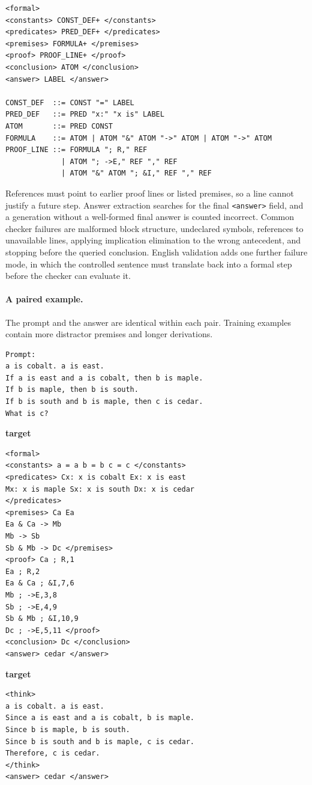 \begin{verbatim}
<formal>
<constants> CONST_DEF+ </constants>
<predicates> PRED_DEF+ </predicates>
<premises> FORMULA+ </premises>
<proof> PROOF_LINE+ </proof>
<conclusion> ATOM </conclusion>
<answer> LABEL </answer>

CONST_DEF  ::= CONST "=" LABEL
PRED_DEF   ::= PRED "x:" "x is" LABEL
ATOM       ::= PRED CONST
FORMULA    ::= ATOM | ATOM "&" ATOM "->" ATOM | ATOM "->" ATOM
PROOF_LINE ::= FORMULA "; R," REF
             | ATOM "; ->E," REF "," REF
             | ATOM "&" ATOM "; &I," REF "," REF
\end{verbatim}

References must point to earlier proof lines or listed premises, so a line
cannot justify a future step. Answer extraction searches for the final
\texttt{<answer>} field, and a generation without a well-formed final answer
is counted incorrect. Common checker failures are malformed block structure,
undeclared symbols, references to unavailable lines, applying implication
elimination to the wrong antecedent, and stopping before the queried
conclusion. English validation adds one further failure mode, in which the
controlled sentence must translate back into a formal step before the checker
can evaluate it.

\paragraph{A paired example.}
\label{sec:paired-example}
The prompt and the answer are identical within each pair. Training examples
contain more distractor premises and longer derivations.

\begin{verbatim}
Prompt:
a is cobalt. a is east.
If a is east and a is cobalt, then b is maple.
If b is maple, then b is south.
If b is south and b is maple, then c is cedar.
What is c?
\end{verbatim}

\noindent\begin{minipage}[t]{0.48\linewidth}
\textbf{\formal{} target}
\scriptsize
\begin{verbatim}
<formal>
<constants> a = a b = b c = c </constants>
<predicates> Cx: x is cobalt Ex: x is east
Mx: x is maple Sx: x is south Dx: x is cedar
</predicates>
<premises> Ca Ea
Ea & Ca -> Mb
Mb -> Sb
Sb & Mb -> Dc </premises>
<proof> Ca ; R,1
Ea ; R,2
Ea & Ca ; &I,7,6
Mb ; ->E,3,8
Sb ; ->E,4,9
Sb & Mb ; &I,10,9
Dc ; ->E,5,11 </proof>
<conclusion> Dc </conclusion>
<answer> cedar </answer>
\end{verbatim}
\end{minipage}\hfill
\begin{minipage}[t]{0.48\linewidth}
\textbf{\nat{} target}
\scriptsize
\begin{verbatim}
<think>
a is cobalt. a is east.
Since a is east and a is cobalt, b is maple.
Since b is maple, b is south.
Since b is south and b is maple, c is cedar.
Therefore, c is cedar.
</think>
<answer> cedar </answer>
\end{verbatim}
\end{minipage}

